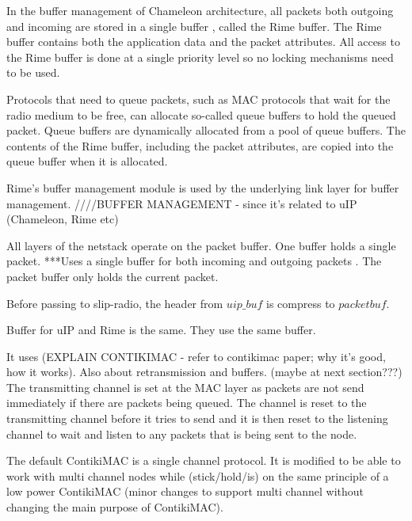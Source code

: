 In the buffer management of Chameleon architecture, all packets both outgoing and incoming are stored in a single buffer \cite{rimeposter}, called the Rime buffer. The Rime buffer contains both the application data and the packet attributes. All access to the Rime buffer is done at a single priority level so no locking mechanisms need to be used.

Protocols that need to queue packets, such as MAC protocols that wait for the radio medium to be free, can allocate so-called queue buffers to hold the queued packet. Queue buffers are dynamically allocated from a pool of queue buffers. The contents of the Rime buffer, including the packet attributes, are copied into the queue buffer when it is allocated.

Rime's buffer management module is used by the underlying link layer for buffer management.
////BUFFER MANAGEMENT - since it's related to uIP (Chameleon, Rime etc)

All layers of the netstack operate on the packet buffer. One buffer holds a single packet. ***Uses a single buffer for both incoming and outgoing packets \cite{uip, rime, rimeposter, contiki}. The packet buffer only holds the current packet.

Before passing to slip-radio, the header from $uip\_buf$ is compress to $packetbuf$.  

Buffer for uIP and Rime is the same. They use the same buffer.
 


It uses (EXPLAIN CONTIKIMAC - refer to contikimac paper; why it's good, how it works). Also about retransmission and buffers. (maybe at next section???) The transmitting channel is set at the MAC layer as packets are not send immediately if there are packets being queued. The channel is reset to the transmitting channel before it tries to send and it is then reset to the listening channel to wait and listen to any packets that is being sent to the node. 

The default ContikiMAC is a single channel protocol. It is modified to be able to work with multi channel nodes while (stick/hold/is) on the same principle of a low power ContikiMAC (minor changes to support multi channel without changing the main purpose of ContikiMAC).

